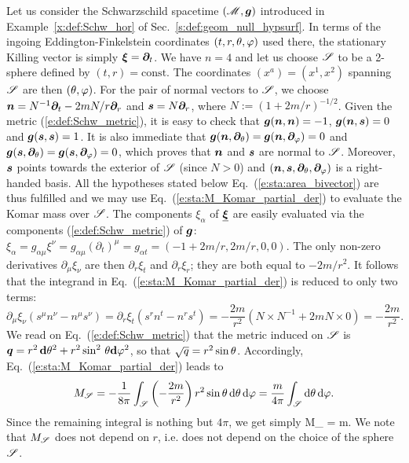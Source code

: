 \begin{example}
\label{x:sta:Komar_mass_Schw}
Let us consider the Schwarzschild spacetime $(\mathscr{M},\bm{g})$
introduced in
Example~\ref{x:def:Schw_hor} of Sec.~\ref{s:def:geom_null_hypsurf}.
In terms of the ingoing Eddington-Finkelstein coordinates $(t,r,\theta,\varphi)$ used there,
the stationary Killing vector is simply $\bm{\xi} = \bm{\partial}_t$.
We have $n=4$ and let us choose $\mathscr{S}$ to be a 2-sphere defined by $(t,r) = \mathrm{const}$.
The coordinates $(x^a) = (x^1, x^2)$ spanning $\mathscr{S}$ are then $(\theta,\varphi)$.
For the pair of normal vectors to $\mathscr{S}$, we choose
$\bm{n} = N^{-1} \bm{\partial}_t  - 2mN/r \bm{\partial}_r$ and $\bm{s} = N \bm{\partial}_r$, where
$N := (1 + 2m/r)^{-1/2}$. Given the metric (\ref{e:def:Schw_metric}), it is
easy to check that
$\bm{g}(\bm{n},\bm{n}) = -1$, $\bm{g}(\bm{n},\bm{s}) = 0$ and $\bm{g}(\bm{s},\bm{s}) = 1$.
It is also immediate that $\bm{g}(\bm{n},\bm{\partial}_\theta) = \bm{g}(\bm{n},\bm{\partial}_\varphi) =  0$ and
$\bm{g}(\bm{s},\bm{\partial}_\theta) = \bm{g}(\bm{s},\bm{\partial}_\varphi) =  0$,
which proves that $\bm{n}$ and $\bm{s}$ are normal to $\mathscr{S}$.
Moreover, $\bm{s}$ points towards the exterior of $\mathscr{S}$ (since $N>0$) and
$(\bm{n},\bm{s},\bm{\partial}_\theta,\bm{\partial}_\varphi)$ is a right-handed basis. All the hypotheses
stated below Eq.~(\ref{e:sta:area_bivector}) are thus fulfilled and we may use
Eq.~(\ref{e:sta:M_Komar_partial_der}) to evaluate the Komar mass over $\mathscr{S}$.
The components $\xi_\alpha$ of $\underline{\bm{\xi}}$ are easily evaluated via
the components (\ref{e:def:Schw_metric}) of $\bm{g}$:
$\xi_\alpha = g_{\alpha\mu} \xi^\nu = g_{\alpha\mu} (\partial_t)^\mu = g_{\alpha t}
= (-1 + 2m/r, 2m/r, 0, 0)$.
The only non-zero derivatives $\partial_\mu\xi_\nu$
are then $\partial_r \xi_t$ and $\partial_r \xi_r$; they are both equal to $-2m/r^2$.
It follows that the integrand in Eq.~(\ref{e:sta:M_Komar_partial_der}) is reduced to only two terms:
\[
  \partial_\mu \xi_\nu (s^\mu   n^\nu - n^\mu s^\nu) =
  \partial_r \xi_t (s^r n^t - n^r s^t) = - \frac{2m}{r^2}
  \left( N \times N^{-1}  + 2m N\times 0 \right) = - \frac{2m}{r^2} .
\]
We read on Eq.~(\ref{e:def:Schw_metric}) that the metric induced on
$\mathscr{S}$ is $\bm{q} = r^2 \, \mathbf{d}\theta^2 + r^2 \sin^2\, \theta \mathbf{d}\varphi^2$, so that $\sqrt{q} = r^2 \sin\theta$.
Accordingly, Eq.~(\ref{e:sta:M_Komar_partial_der}) leads to
\[
    M_{\mathscr{S}} = -\frac{1}{8\pi} \int_{\mathscr{S}} \left( - \frac{2m}{r^2} \right)
    r^2 \sin\theta \, \mathrm{d}\theta \, \mathrm{d}\varphi = \frac{m}{4\pi} \int_{\mathscr{S}} \mathrm{d}\theta \, \mathrm{d}\varphi .
\]
Since the remaining integral is nothing but $4\pi$, we get simply
\be \label{e:sta:Komar_mass_Schwarz}
    M_{\Sp} = m.
\ee
We note that $M_{\mathscr{S}}$ does not depend on $r$, i.e. does not depend on the
choice of the sphere $\mathscr{S}$.
\end{example}

